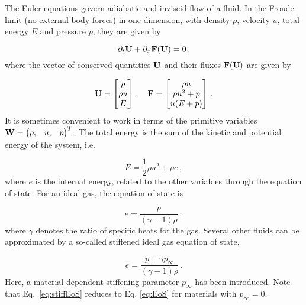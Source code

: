 \documentclass[final,3p,twocolumn,times]{elsarticle}
\begin{document}
The Euler equations govern adiabatic and inviscid flow of a fluid. In the
Froude limit (no external body forces) in one dimension, with density $\rho$,
velocity $u$, total energy $E$ and pressure $p$, they are given by 

\begin{equation}
    \partial_t {\bf U} + \partial_x {\bf F(U)} = 0\,,
    \label{eq:euler}
\end{equation}
%
where the vector of conserved quantities ${\bf U}$ and their fluxes ${\bf F(U)}$ are given by

\begin{equation*}
    {\bf U} = 
    \begin{bmatrix} 
        \rho \\ 
        \rho u \\ 
        E 
    \end{bmatrix}
    \,,\quad
    {\bf F} = 
    \begin{bmatrix}
        \rho u \\ 
        \rho u^2 + p \\
        u(E+p) 
    \end{bmatrix}
    \,.
\end{equation*}
%
It is sometimes convenient to work in terms of the primitive variables ${\bf W} =
\begin{pmatrix} \rho, & u, & p \end{pmatrix}^T$. The total energy is the sum of
the kinetic and potential energy of the system, i.e.~ 

\begin{equation}
    E = \frac{1}{2} \rho u^2 + \rho e \,,
    \label{eq:energy}
\end{equation}
%
where $e$ is the internal energy, related to the other variables through the
equation of state. For an ideal gas, the equation of state is 

\begin{equation}
     e = \frac{p}{(\gamma-1)\rho} \,,
     \label{eq:EoS}
 \end{equation}
%
where $\gamma$ denotes the ratio of specific heats for the gas. Several other
fluids can be approximated by a so-called stiffened ideal gas equation of
state, 

\begin{equation}
    e = \frac{p+\gamma p_{\infty}}{(\gamma-1)\rho} \,.
    \label{eq:stiffEoS}
\end{equation}
%
Here, a material-dependent stiffening parameter $p_{\infty}$ has been
introduced. Note that Eq.\ \eqref{eq:stiffEoS} reduces to Eq. \eqref{eq:EoS} for
materials with $p_{\infty}=0$.
\end{document}
